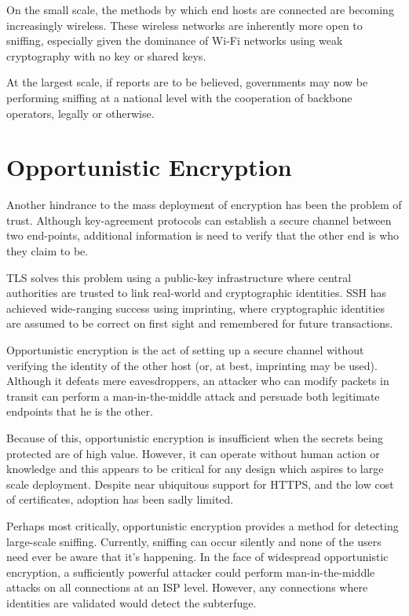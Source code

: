 \documentclass[conference]{IEEEtran}
\begin{document}
On the small scale, the methods by which end hosts are connected are becoming
increasingly wireless. These wireless networks are inherently more open to
sniffing, especially given the dominance of Wi-Fi networks using weak
cryptography\cite{wep} with no key or shared keys.

At the largest scale, if reports are to be believed, governments may now be
performing sniffing at a national level with the cooperation of backbone
operators, legally or otherwise.

\section{Opportunistic Encryption}

Another hindrance to the mass deployment of encryption has been the problem of
trust. Although key-agreement protocols can establish a secure channel between
two end-points, additional information is need to verify that the other end is
who they claim to be.

TLS solves this problem using a public-key infrastructure where central
authorities are trusted to link real-world and cryptographic identities. SSH
has achieved wide-ranging success using imprinting, where cryptographic
identities are assumed to be correct on first sight and remembered for future
transactions.

Opportunistic encryption is the act of setting up a secure channel without
verifying the identity of the other host (or, at best, imprinting may be used).
Although it defeats mere eavesdroppers, an attacker who can modify packets in
transit can perform a man-in-the-middle attack and persuade both legitimate
endpoints that he is the other.

Because of this, opportunistic encryption is insufficient when the secrets
being protected are of high value. However, it can operate without human
action or knowledge and this appears to be critical for any design which
aspires to large scale deployment. Despite near ubiquitous support for HTTPS,
and the low cost of certificates, adoption has been sadly limited.

Perhaps most critically, opportunistic encryption provides a method for
detecting large-scale sniffing. Currently, sniffing can occur silently and none
of the users need ever be aware that it's happening. In the face of widespread
opportunistic encryption, a sufficiently powerful attacker could perform
man-in-the-middle attacks on all connections at an ISP level. However, any
connections where identities are validated would detect the subterfuge.
\end{document}
